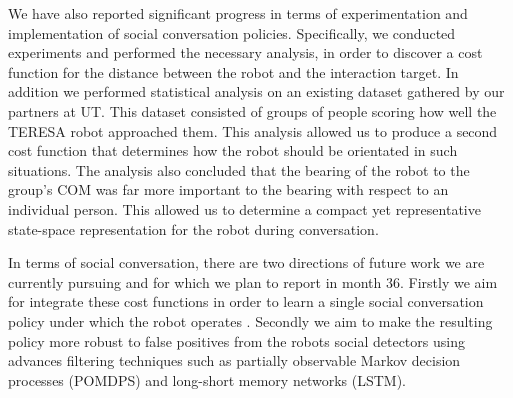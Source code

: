 \documentclass[a4paper,11pt]{report}
\begin{document}
 We have also reported significant progress in terms of experimentation and implementation of social conversation policies. Specifically, we conducted experiments and performed the necessary analysis, in order to discover a cost function for the distance between the robot and the interaction target. In addition we performed statistical analysis on an existing dataset gathered by our partners at UT. This dataset consisted of groups of people scoring how well the TERESA robot approached them. This analysis allowed us to produce a second cost function that determines how the robot should be orientated in such situations. The analysis also concluded that the bearing of the robot to the group's COM was far more important to the bearing with respect to an individual person. This allowed us to determine a compact yet representative state-space representation for the robot during conversation. 

 In terms of social conversation, there are two directions of future work we are currently pursuing and for which we plan to report in month 36. Firstly we aim for integrate these cost functions in order to learn a single social conversation policy under which the robot operates . Secondly we aim to make the resulting policy more robust to false positives from the robots social detectors using advances filtering techniques such as partially observable Markov decision processes (POMDPS) and long-short memory networks (LSTM).






\end{document}
